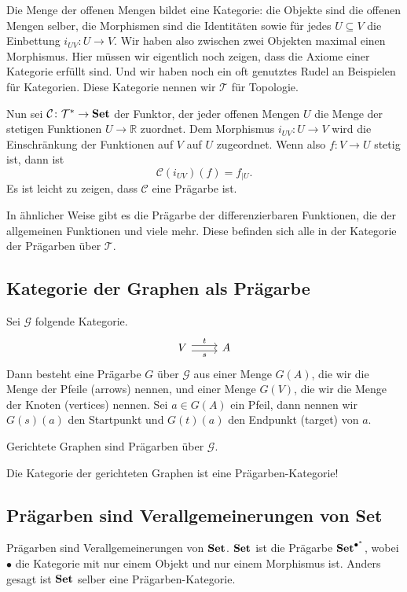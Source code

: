\documentclass[a4paper]{amsart}
\theoremstyle{definition}
\newcommand{\R}{\ensuremath{\mathbb{ R }}}
\newcommand{\CC}{\ensuremath{\mathcal{ C }}}
\newcommand{\Set}{\text{\textbf{Set}}}
\begin{document}
Die Menge der offenen Mengen bildet eine Kategorie: die Objekte sind die offenen Mengen selber, die Morphismen sind die Identitäten sowie für jedes $U \subseteq V$ die Einbettung $i_{UV} \colon U \to V$.
Wir haben also zwischen zwei Objekten maximal einen Morphismus. Hier müssen wir eigentlich noch zeigen, dass die Axiome einer Kategorie erfüllt sind. Und wir haben noch ein oft genutztes Rudel an Beispielen für Kategorien. Diese Kategorie nennen wir $\mathcal{T}$ für Topologie.

Nun sei $\CC \colon \mathcal{T}^* \to \Set$ der Funktor, der jeder offenen Mengen $U$ die Menge der stetigen Funktionen $U \to \R$ zuordnet. Dem Morphismus $i_{UV} \colon U \to V$ wird die Einschränkung der Funktionen auf $V$ auf $U$ zugeordnet. Wenn also $f \colon V \to U$ stetig ist, dann ist
\begin{equation}
   \CC(i_{UV})(f) = f_{|U}.
\end{equation}
Es ist leicht zu zeigen, dass $\CC$ eine Prägarbe ist. 

In ähnlicher Weise gibt es die Prägarbe der differenzierbaren Funktionen, die der allgemeinen Funktionen und viele mehr. Diese befinden sich alle in der Kategorie der Prägarben über $\mathcal{T}$.

\subsection{Kategorie der Graphen als Prägarbe}
Sei $\mathcal{G}$ folgende Kategorie.
\[
\begin{tikzcd}
   V \arrow[shift right, swap]{r}{s} \arrow[shift left]{r}{t} & A
\end{tikzcd}
\]
Dann besteht eine Prägarbe $G$ über $\mathcal{G}$ aus einer Menge $G(A)$, die wir die Menge der Pfeile (arrows) nennen, und einer Menge $G(V)$, die wir die Menge der Knoten (vertices) nennen. Sei $a \in G(A)$ ein Pfeil, dann nennen wir $G(s)(a)$ den Startpunkt und $G(t)(a)$ den Endpunkt (target) von $a$.

Gerichtete Graphen sind Prägarben über $\mathcal{G}$.

Die Kategorie der gerichteten Graphen ist eine Prägarben-Kategorie!

\subsection{Prägarben sind Verallgemeinerungen von Set}
Prägarben sind Verallgemeinerungen von $\Set$. $\Set$ ist die Prägarbe $\Set^{\bullet^*}$, wobei $\bullet$ die Kategorie mit nur einem Objekt und nur einem Morphismus ist. Anders gesagt ist $\Set$ selber eine Prägarben-Kategorie.
\end{document}
